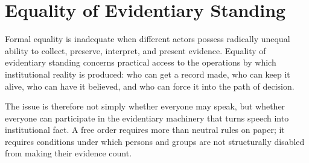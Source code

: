 
\chapter{Equality of Evidentiary Standing}
\label{ch:ch107}

Formal equality is inadequate when different actors possess radically unequal ability to collect, preserve, interpret, and present evidence. Equality of evidentiary standing concerns practical access to the operations by which institutional reality is produced: who can get a record made, who can keep it alive, who can have it believed, and who can force it into the path of decision.

The issue is therefore not simply whether everyone may speak, but whether everyone can participate in the evidentiary machinery that turns speech into institutional fact. A free order requires more than neutral rules on paper; it requires conditions under which persons and groups are not structurally disabled from making their evidence count.
